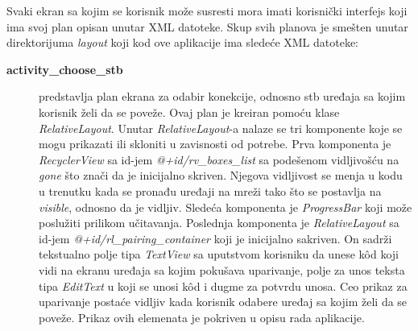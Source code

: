 \documentclass[implementacija.tex]{subfiles}
\begin{document}
Svaki ekran sa kojim se korisnik može susresti mora imati korisnički interfejs koji ima svoj plan opisan unutar XML datoteke. Skup svih planova je smešten unutar direktorijuma \textit{layout} koji kod ove aplikacije ima sledeće XML datoteke:
\begin{description}
\item[\textbf{activity\_choose\_stb}] predstavlja plan ekrana za odabir konekcije, odnosno stb uređaja sa kojim korisnik želi da se poveže. Ovaj plan je kreiran pomoću klase \textit{RelativeLayout}. Unutar \textit{RelativeLayout}-a nalaze se tri komponente koje se mogu prikazati ili skloniti u zavisnosti od potrebe. Prva komponenta je \textit{RecyclerView} sa id-jem \textit{@+id/rv\_boxes\_list} sa podešenom vidljivošću na \textit{gone} što znači da je inicijalno skriven. Njegova vidljivost se menja u kodu u trenutku kada se pronađu uređaji na mreži tako što se postavlja na \textit{visible}, odnosno da je vidljiv. Sledeća komponenta je \textit{ProgressBar} koji može poslužiti prilikom učitavanja. Poslednja komponenta je \textit{RelativeLayout} sa id-jem \textit{@+id/rl\_pairing\_container} koji je inicijalno sakriven. On sadrži tekstualno polje tipa \textit{TextView} sa uputstvom korisniku da unese k\^{o}d koji vidi na ekranu uređaja sa kojim pokušava uparivanje, polje za unos teksta tipa \textit{EditText} u koji se unosi k\^{o}d i dugme za potvrdu unosa. Ceo prikaz za uparivanje postaće vidljiv kada korisnik odabere uređaj sa kojim želi da se poveže. Prikaz ovih elemenata je pokriven u opisu rada aplikacije.


\end{description}
\end{document}
